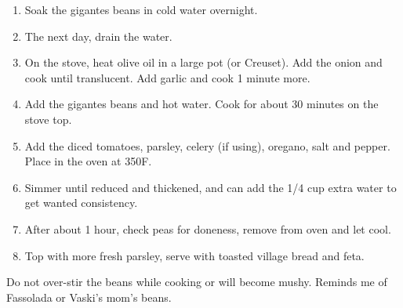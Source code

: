 \bigskip

\begin{enumerate}
    \item Soak the gigantes beans in cold water overnight.
    \item The next day, drain the water.
    \item On the stove, heat olive oil in a large pot (or Creuset). Add the onion and cook until translucent. Add garlic and cook 1 minute more.
    \item Add the gigantes beans and hot water. Cook for about 30 minutes on the stove top.
    \item Add the diced tomatoes, parsley, celery (if using), oregano, salt and pepper. Place in the oven at 350\degree F.
    \item Simmer until reduced and thickened, and can add the 1/4 cup extra water to get wanted consistency.
    \item After about 1 hour, check peas for doneness, remove from oven and let cool.
    \item Top with more fresh parsley, serve with toasted village bread and feta.
\end{enumerate}

Do not over-stir the beans while cooking or will become mushy.
Reminds me of Fassolada or Vaski's mom's beans.

